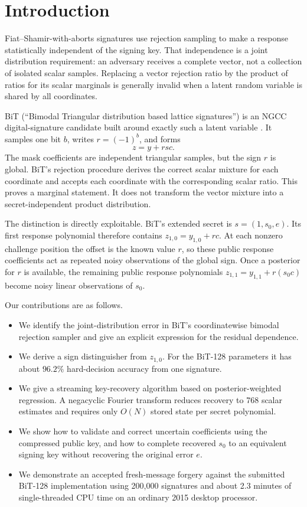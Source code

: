 \documentclass[11pt,a4paper]{article}
\begin{document}
\section{Introduction}

Fiat--Shamir-with-aborts signatures use rejection sampling to make a response
statistically independent of the signing key.  That independence is a joint
distribution requirement: an adversary receives a complete vector, not a
collection of isolated scalar samples.  Replacing a vector rejection ratio by
the product of ratios for its scalar marginals is generally invalid when a
latent random variable is shared by all coordinates.

BiT (``Bimodal Triangular distribution based lattice signatures'') is an NGCC
digital-signature candidate built around exactly such a latent variable
\cite{BiT}.  It samples one bit $b$, writes $r=(-1)^b$, and forms
\[
             z = y+rsc.
\]
The mask coefficients are independent triangular samples, but the sign $r$ is
global.  BiT's rejection procedure derives the correct scalar mixture for each
coordinate and accepts each coordinate with the corresponding scalar ratio.
This proves a marginal statement.  It does not transform the vector mixture
into a secret-independent product distribution.

The distinction is directly exploitable.  BiT's extended secret is
$s=(1,s_0,e)$.  Its first response polynomial therefore contains
$z_{1,0}=y_{1,0}+rc$.  At each nonzero challenge position the offset is the
known value $r$, so these public response coefficients act as repeated noisy
observations of the global sign.  Once a posterior for $r$ is available, the
remaining public response polynomials
$z_{1,1}=y_{1,1}+r(s_0c)$ become noisy linear observations of $s_0$.

Our contributions are as follows.

\begin{itemize}[leftmargin=1.5em]
  \item We identify the joint-distribution error in BiT's coordinatewise
        bimodal rejection sampler and give an explicit expression for the
        residual dependence.
  \item We derive a sign distinguisher from $z_{1,0}$.  For the BiT-128
        parameters it has about $96.2\%$ hard-decision accuracy from one
        signature.
  \item We give a streaming key-recovery algorithm based on posterior-weighted
        regression.  A negacyclic Fourier transform reduces recovery to 768
        scalar estimates and requires only $O(N)$ stored state per secret
        polynomial.
  \item We show how to validate and correct uncertain coefficients using the
        compressed public key, and how to complete recovered $s_0$ to an
        equivalent signing key without recovering the original error $e$.
  \item We demonstrate an accepted fresh-message forgery against the submitted
        BiT-128 implementation using 200,000 signatures and about 2.3 minutes
        of single-threaded CPU time on an ordinary 2015 desktop processor.
\end{itemize}
\end{document}
